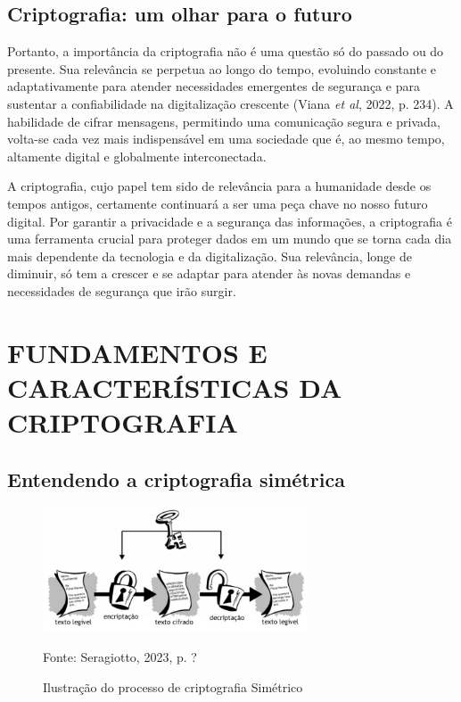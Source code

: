 \subsection{Criptografia: um olhar para o futuro}

Portanto, a importância da criptografia não é uma questão só do passado ou do
presente. Sua relevância se perpetua ao longo do tempo, evoluindo constante e
adaptativamente para atender necessidades emergentes de segurança e para
sustentar a confiabilidade na digitalização crescente (Viana \textit{et al},
2022, p. 234). A habilidade de cifrar mensagens, permitindo uma comunicação
segura e privada, volta-se cada vez mais indispensável em uma sociedade que é,
ao mesmo tempo, altamente digital e globalmente interconectada.

A criptografia, cujo papel tem sido de relevância para a humanidade desde os
tempos antigos, certamente continuará a ser uma peça chave no nosso futuro
digital. Por garantir a privacidade e a segurança das informações, a
criptografia é uma ferramenta crucial para proteger dados em um mundo que se
torna cada dia mais dependente da tecnologia e da digitalização. Sua
relevância, longe de diminuir, só tem a crescer e se adaptar para atender às
novas demandas e necessidades de segurança que irão surgir.

\section{FUNDAMENTOS E CARACTERÍSTICAS DA CRIPTOGRAFIA}

\subsection{Entendendo a criptografia simétrica}

\begin{figure}[h!] \centering
	\includegraphics[width=0.7\textwidth]{Imagens/ilustracao_do_processo_de_criptografia_simetrico}
	\caption{Ilustração do processo de criptografia Simétrico}
	Fonte: Seragiotto, 2023, p. ?
\end{figure}

